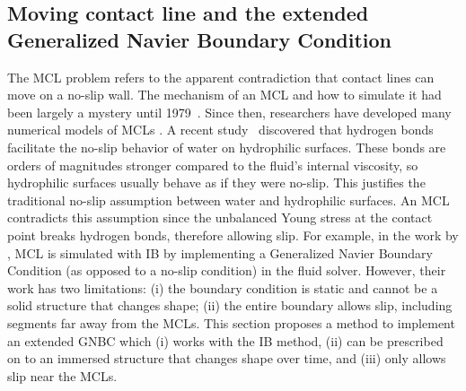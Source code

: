 \documentclass[%
 aip,
 amsmath,amssymb,
 reprint,
 floatfix
]{revtex4-1}
\begin{document}
\subsection{Moving contact line and the extended Generalized Navier Boundary Condition} \label{subsec:mcl}
The MCL problem refers to the apparent contradiction that contact lines can move on a no-slip wall. The mechanism of an MCL and how to simulate it had been largely a mystery until 1979~\cite{dussan1979spreading}. Since then, researchers have developed many numerical models of MCLs \cite{sui2014numerical, liu2015diffuse}. A recent study~\cite{johansson2015water} discovered that hydrogen bonds facilitate the no-slip behavior of water on hydrophilic surfaces. These bonds are orders of magnitudes stronger compared to the fluid's internal viscosity, so hydrophilic surfaces usually behave as if they were no-slip. This justifies the traditional no-slip assumption between water and hydrophilic surfaces. An MCL contradicts this assumption since the unbalanced Young stress at the contact point breaks hydrogen bonds, therefore allowing slip. For example, in the work by \citet{lai2010numerical}, MCL is simulated with IB by implementing a Generalized Navier Boundary Condition (as opposed to a no-slip condition) in the fluid solver. However, their work has two limitations: (i) the boundary condition is static and cannot be a solid structure that changes shape; (ii) the entire boundary allows slip, including segments far away from the MCLs. This section proposes a method to implement an extended GNBC which (i) works with the IB method, (ii) can be prescribed on to an immersed structure that changes shape over time, and (iii) only allows slip near the MCLs. 
\end{document}
